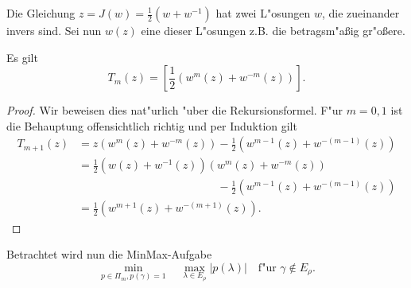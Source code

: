Die Gleichung $z = J(w) = \frac{1}{2}(w + w^{-1})$ hat zwei L"osungen $w$, 
die zueinander invers sind.
Sei nun $w(z)$ eine dieser L"osungen z.B. die betragsm"a\ss ig gr"o\ss ere.

\begin{lem} \label{tscheby_lem}
Es gilt
\[
T_m(z)=\left[ \frac{1}{2}\left( w^m(z) + w^{-m}(z) \right) \right].
\]
\end{lem}
\begin{proof}
Wir beweisen dies nat"urlich "uber die Rekursionsformel. F"ur $m=0,1$ ist die Behauptung 
offensichtlich richtig und per Induktion gilt
\begin{align*}
T_{m+1}(z) &= z\left( w^m(z) + w^{-m}(z) \right) - \frac{1}{2}\left( w^{m-1}(z) + w^{-(m-1)}(z) \right) \\
&= \frac{1}{2} \left( w(z) + w^{-1}(z) \right)\left( w^m(z) + w^{-m}(z) \right)\\
& \phantom{= z\left( w^m(z) + w^{-m}(z) \right)}
				-\frac{1}{2}\left( w^{m-1}(z) + w^{-(m-1)}(z) \right) \\
&= \frac{1}{2}\left( w^{m+1}(z) + w^{-(m+1)}(z) \right).
\end{align*}
\end{proof}

Betrachtet wird nun die MinMax-Aufgabe
\begin{equation} \label{minmaxell_eq}
\underset{p \in \Pi_m, p(\gamma) = 1}{\min} \quad  \underset{\lambda \in E_{\rho}}
\max |p(\lambda)| \quad \text{f"ur } \gamma \notin E_{\rho}.
\end{equation}

